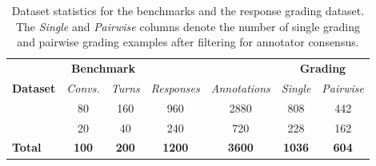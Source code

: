 

\begin{table}[t]
\centering

\begin{tabular}{l|cc|cc|cc}
\toprule
& \multicolumn{2}{c|}{\textbf{Benchmark}} & \multicolumn{2}{c|}{\textbf{\judgebenchmark{}}}  & \multicolumn{2}{c}{\textbf{Grading}}\\
\textbf{Dataset} & \emph{Convs.} & \emph{Turns} & \emph{Responses} & \emph{Annotations} & \emph{Single} & \emph{Pairwise} \\
\midrule
\evalbenchmark{} & 80 & 160 & 960 & 2880 & 808 & 442 \\
\cevalbenchmark{} & 20 & 40 & 240 & 720 & 228 & 162 \\
\midrule
\textbf{Total} & \textbf{100} & \textbf{200} & \textbf{1200} & \textbf{3600} & \textbf{1036} & \textbf{604} \\
\bottomrule
\end{tabular}


\caption{Dataset statistics for the benchmarks and the response grading dataset. The \emph{Single} and \emph{Pairwise} columns denote the number of single grading and pairwise grading examples after filtering for annotator consensus.}
\label{tab:combined_dataset}
\end{table}
